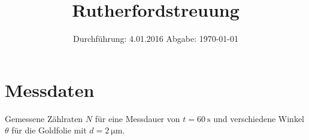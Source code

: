 

\subject{V16}
\title{Rutherfordstreuung}
\date{
  Durchführung: 4.01.2016
  \hspace{3em}
  Abgabe: \today
}



\maketitle
\thispagestyle{empty}
\tableofcontents
\newpage





\printbibliography

\newpage
\appendix
\section{Messdaten}
\begin{table}
  \centering
  \caption{Gemessene Zählraten $N$ für eine Messdauer von $t = \SI{60}{\second}$ und verschiedene Winkel $θ$ für die Goldfolie mit $d=\SI{2}{\micro\meter}$.}
  \label{tab:scattering}
  
\end{table}


